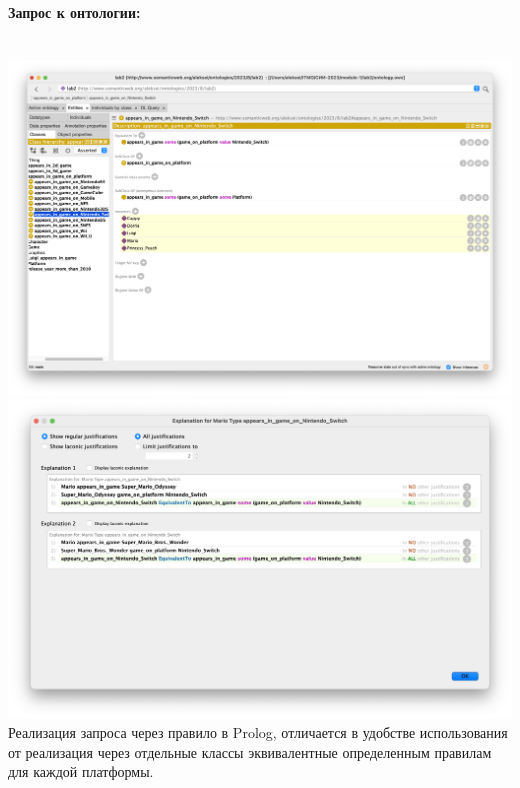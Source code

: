 \documentclass[12pt,onecolumn]{article}
\newcommand{\nparagraph}[1]{\paragraph{#1}\mbox{}\\}
\begin{document}
\nparagraph{Запрос к онтологии:}
\includegraphics[width=\textwidth]{image/ontology-test-5.png}
\includegraphics[width=\textwidth]{image/ontology-test-6.png}
Реализация запроса через правило в Prolog, отличается в удобстве использования от реализация через отдельные классы эквивалентные определенным правилам для каждой платформы.
\end{document}
